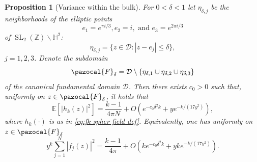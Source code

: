 \documentclass[12pt, a4paper]{amsart}
\newcommand{\tmop}[1]{\ensuremath{\operatorname{#1}}}
\newtheorem{proposition}[theorem]{Proposition}
\theoremstyle{definition}
\newcommand {\E} {\mathbb{E}}
\newcommand {\1} {\mathbf{1}}
\newcommand {\C} {\mathbb {C}}
\newcommand {\Dc} {\mathcal{D}}
\newcommand {\Fc} {\pazocal{F}}
\numberwithin{equation}{section}
\begin{document}
\begin{proposition}[Variance within the bulk]
\label{prop:Fk covar}
For $0< \delta <1$ let $\eta_{\delta,{j}}$ be the neighborhoods of the elliptic points
\begin{equation}
\label{eq:elliptic points}
e_1=e^{\pi i/3}, e_2=i, \text{ and } e_3=e^{2\pi i/3}
\end{equation}
of $\tmop{SL}_2(\mathbb Z) \backslash \mathbb H^2$:
$$\eta_{\delta,j}=\{z\in \Dc: |z-e_j| \le \delta\},$$ $j=1,2,3$. Denote the subdomain
\begin{equation}
\label{eq:Fdeltadef}
\Fc_{\delta}
=\Dc\setminus \{ \eta_{\delta,1} \cup \eta_{\delta,2} \cup \eta_{\delta,3} \}
\end{equation}
of the canonical fundamental domain $\Dc$.
Then there exists $c_0>0$ such that, uniformly on $z \in \Fc_{\delta}$, it holds that
\begin{equation*}
\E\left[\left|h_{k}(z)\right|^{2}\right] = \frac{k-1}{4\pi N}+O\left( e^{-c_0\delta^2 k}+y e^{-k/(17y^2)}   \right),
\end{equation*}
where $h_{k}(\cdot)$ is as in \eqref{eq:fk spher field def}.
Equivalently, one has uniformly on $z \in \Fc_{\delta}$
\begin{equation}
\label{eq:var asuymp Dk sum}
y^{k}\sum_{j=1}^{N}\left|f_{j}\left(z\right)\right|^{2}=\frac{k-1}{4\pi}+O\left( ke^{-c_0\delta^2 k}+yk e^{-k/(17y^2)}   \right) .
\end{equation}



\end{proposition}
\end{document}
